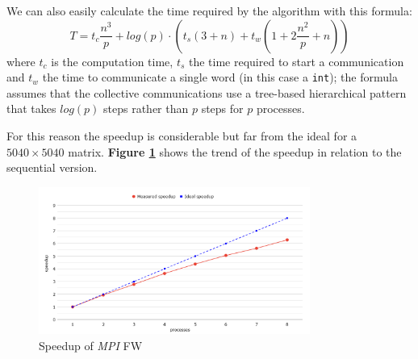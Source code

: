 We can also easily calculate the time required by the algorithm with this formula:
\[T = t_c \frac{n^3}{p} + log(p) \cdot(t_s(3+n) + t_w(1 + 2 \frac{n^2}{p} + n))\]
where $t_c$ is the computation time, $t_s$ the time required to start a communication and $t_w$ the time to communicate a single word (in this case a \texttt{int}); the formula
assumes that the collective communications use a tree-based hierarchical pattern that takes $log(p)$ steps rather than $p$ steps for $p$ processes.

For this reason the speedup is considerable but far from the ideal for a $5040\times5040$ matrix. \textbf{Figure \ref*{fig:mpi-speedup}} shows the trend of the speedup in relation to the 
sequential version.

\begin{figure}[h!]
\centering                                                                        
\includegraphics[width=3.5in]{diagrams/mpi-speedup}
\captionsetup{justification=centering}                                                                                                                                   
\caption{Speedup of \emph{MPI} FW}                                                                                                                                            
\label{fig:mpi-speedup}                                                                                                                                                           
\end{figure}


